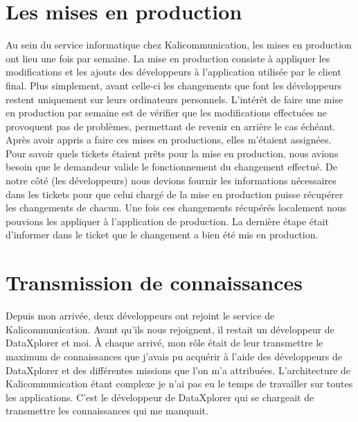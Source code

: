 \section{Les mises en production}
Au sein du service informatique chez Kalicommunication, les mises en production ont lieu une fois par semaine. La mise en production consiste à appliquer les modifications et les ajouts des développeurs à l'application utilisée par le client final. Plus simplement, avant celle-ci les changements que font les développeurs restent uniquement sur leurs ordinateurs personnels.\newline
L'intérêt de faire une mise en production par semaine est de vérifier que les modifications effectuées ne provoquent pas de problèmes, permettant de revenir en arrière le cas échéant.\newline
Après avoir appris a faire ces mises en productions, elles m'étaient assignées. Pour savoir quels tickets étaient prêts pour la mise en production, nous avions besoin que le demandeur valide le fonctionnement du changement effectué. De notre côté (les développeurs) nous devions fournir les informations nécessaires dans les tickets pour que celui chargé de la mise en production puisse récupérer les changements de chacun. Une fois ces changements récupérés localement nous pouvions les appliquer à l'application de production. La dernière étape était d'informer dans le ticket que le changement a bien été mis en production.

\section{Transmission de connaissances}
Depuis mon arrivée, deux développeurs ont rejoint le service de Kalicommunication. Avant qu'ils nous rejoignent, il restait un développeur de DataXplorer et moi. À chaque arrivé, mon rôle était de leur transmettre le maximum de connaissances que j'avais pu acquérir à l'aide des développeurs de DataXplorer et des différentes missions que l'on m'a attribuées. L'architecture de Kalicommunication étant complexe je n'ai pas eu le temps de travailler sur toutes les applications. C'est le développeur de DataXplorer qui se chargeait de transmettre les connaissances qui me manquait.

